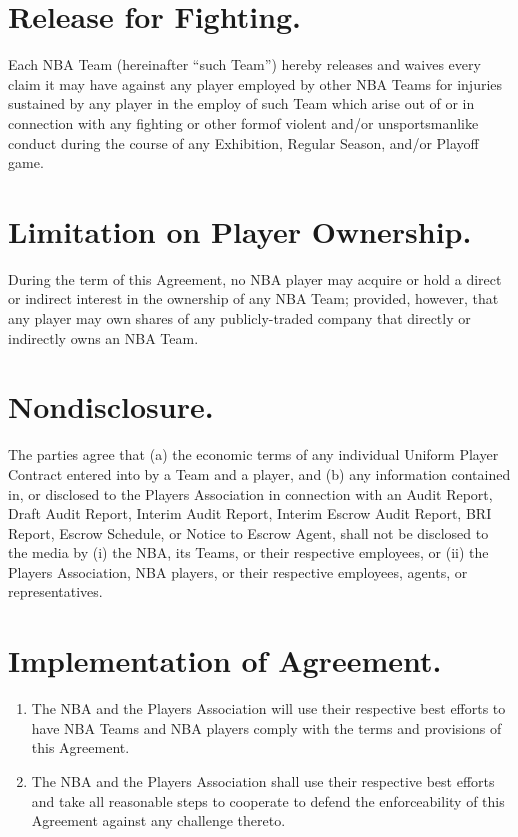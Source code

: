 \documentclass[
]{book}
\providecommand{\tightlist}{%
  \setlength{\itemsep}{0pt}\setlength{\parskip}{0pt}}
\begin{document}
\hypertarget{release-for-fighting.}{%
\section{Release for Fighting.}\label{release-for-fighting.}}

Each NBA Team (hereinafter ``such Team'') hereby releases and waives every claim it may have against any player employed by other NBA Teams for injuries sustained by any player in the employ of such Team which arise out of or in connection with any fighting or other formof violent and/or unsportsmanlike conduct during the course of any Exhibition, Regular Season, and/or Playoff game.

\hypertarget{limitation-on-player-ownership.}{%
\section{Limitation on Player Ownership.}\label{limitation-on-player-ownership.}}

During the term of this Agreement, no NBA player may acquire or hold a direct or indirect interest in the ownership of any NBA Team; provided, however, that any player may own shares of any publicly-traded company that directly or indirectly owns an NBA Team.

\hypertarget{nondisclosure.}{%
\section{Nondisclosure.}\label{nondisclosure.}}

The parties agree that (a) the economic terms of any individual Uniform Player Contract entered into by a Team and a player, and (b) any information contained in, or disclosed to the Players Association in connection with an Audit Report, Draft Audit Report, Interim Audit Report, Interim Escrow Audit Report, BRI Report, Escrow Schedule, or Notice to Escrow Agent, shall not be disclosed to the media by (i) the NBA, its Teams, or their respective employees, or (ii) the Players Association, NBA players, or their respective employees, agents, or representatives.

\hypertarget{implementation-of-agreement.}{%
\section{Implementation of Agreement.}\label{implementation-of-agreement.}}

\begin{enumerate}
\def\labelenumi{(\alph{enumi})}
\tightlist
\item
  The NBA and the Players Association will use their respective best efforts to have NBA Teams and NBA players comply with the terms and provisions of this Agreement.
\item
  The NBA and the Players Association shall use their respective best efforts and take all reasonable steps to cooperate to defend the enforceability of this Agreement against any challenge thereto.
\end{enumerate}
\end{document}
